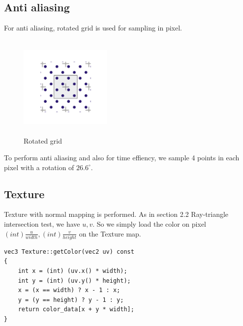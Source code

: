 \documentclass[acmtog]{acmart}
\begin{document}
\subsection{Anti aliasing}
For anti aliasing, rotated grid is used for sampling in pixel.\\
\begin{figure}[H]
	\centering
	\includegraphics[width=0.4\textwidth,height=2in]{antialiasing.png}
	\caption{Rotated grid}
\end{figure}
To perform anti aliasing and also for time effiency, we sample 4 points in each pixel with a rotation of $26.6^{\circ}$.

\subsection{Texture}
Texture with normal mapping is performed. As in section 2.2 Ray-triangle intersection test, we have $u, v$. So we simply load the color on pixel
$(int)\frac{u}{width}, (int)\frac{v}{height}$ on the Texture map.
\begin{lstlisting}
vec3 Texture::getColor(vec2 uv) const
{
	int x = (int) (uv.x() * width);
	int y = (int) (uv.y() * height);
	x = (x == width) ? x - 1 : x;
	y = (y == height) ? y - 1 : y;
	return color_data[x + y * width];
}
\end{lstlisting}
\end{document}

